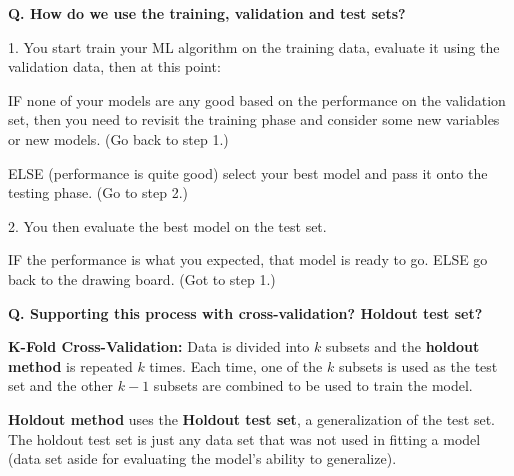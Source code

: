 \begin{frame}[fragile]{\textbf{Q. How do we use the training, validation and test sets?}}
  \begin{wideitemize}
    \item[1.] You start train your ML algorithm on the training data, evaluate it
    using the validation data, then at this point:\medskip
    \begin{wideitemize}
      \item IF none of your models are any good based on the performance on the
      validation set, then you need to revisit the training phase and consider
      some new variables or new models. (Go back to step 1.)
      \item ELSE (performance is quite good) select your best model
      and pass it onto the testing phase. (Go to step 2.)
    \end{wideitemize}
    \item[2.] You then evaluate the best model on the test set.\medskip
    \begin{wideitemize}
      \item IF the performance is what you expected, that model is ready to go.
      ELSE go back to the drawing board. (Got to step 1.)
    \end{wideitemize}
  \end{wideitemize}
\end{frame}

\begin{frame}[fragile]{\textbf{Q. Supporting this process with cross-validation? Holdout test set?}}
  \begin{wideitemize}
  \item \textbf{K-Fold Cross-Validation:} Data is divided into $k$ subsets and the \textbf{holdout method}
    is repeated $k$ times. Each time, one of the $k$ subsets is used as the test set and the other
    $k - 1$ subsets are combined to be used to train the model.
  \item \textbf{Holdout method} uses the \textbf{Holdout test set}, a
    generalization of the test set. The holdout test set is just any data set
    that was not used in fitting a model (data set aside for evaluating the
    model's ability to generalize).
  \end{wideitemize}
\end{frame}


